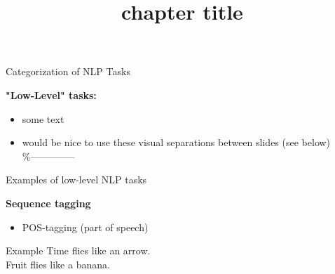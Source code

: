 


\newcommand*\POS[1]{\textsubscript{\texttt{#1}}} %
\usepackage{qtree} %

\newcommand{\learninggoals}{
\item defined the key learning goals here
\item second learning goal}

\title{chapter title}
\date{}




\begin{vbframe}{Categorization of NLP Tasks}

\vfill

\textbf{"Low-Level" tasks:}

	\begin{itemize}
		\item some text
		\item would be nice to use these visual separations between slides (see below)\\
					\%--------------
	\end{itemize}

\vfill

\end{vbframe}


\begin{vbframe}{Examples of low-level NLP tasks}

\textbf{Sequence tagging}

\begin{itemize}
	\item POS-tagging (part of speech)
\end{itemize}
	
\begin{exampleblock}{Example}
	Time flies   like   an   arrow.\\Fruit   flies   like   a   banana.
\end{exampleblock}

\vfill

\end{vbframe}

